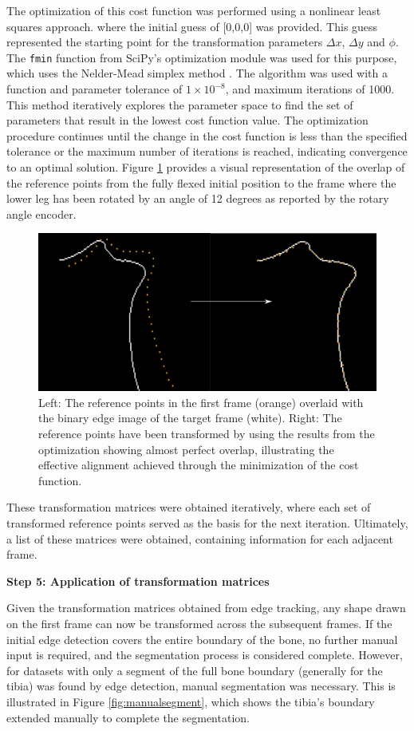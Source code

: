 \documentclass{micro-econ-thesis}
\begin{document}
The optimization of this cost function was performed using a nonlinear least squares approach. where the initial guess of [0,0,0] was provided. This guess represented the starting point for the transformation parameters $\Delta x$, $\Delta y$ and $\phi$. The \texttt{fmin} function from SciPy’s optimization module was used for this purpose, which uses the Nelder-Mead simplex method \parencite{nelder_simplex_1965}. The algorithm was used with a function and parameter tolerance of $1 \times 10^{-8}$, and maximum iterations of 1000. This method iteratively explores the parameter space to find the set of parameters that result in the lowest cost function value. The optimization procedure continues until the change in the cost function is less than the specified tolerance or the maximum number of iterations is reached, indicating convergence to an optimal solution. Figure \ref{fig:edge_tracking} provides a visual representation of the overlap of the reference points from the fully flexed initial position to the frame where the lower leg has been rotated by an angle of 12 degrees as reported by the rotary angle encoder. 
\begin{figure}[H]
	\centering
	\includegraphics[width=0.7\linewidth]{image137}
	\caption{Left: The reference points in the first frame (orange) overlaid with the binary edge image of the target frame (white). Right: The reference points have been transformed by using the results from the optimization showing almost perfect overlap, illustrating the effective alignment achieved through the minimization of the cost function.}
	\label{fig:edge_tracking}
\end{figure}

These transformation matrices were obtained iteratively, where each set of transformed reference points served as the basis for the next iteration. Ultimately, a list of these matrices were obtained, containing information for each adjacent frame. 


\textbf{Step 5: Application of transformation matrices }

Given the transformation matrices obtained from edge tracking, any shape drawn on the first frame can now be transformed across the subsequent frames. If the initial edge detection covers the entire boundary of the bone, no further manual input is required, and the segmentation process is considered complete. However, for datasets with only a segment of the full bone boundary (generally for the tibia) was found by edge detection, manual segmentation was necessary. This is illustrated in Figure \ref{fig:manualsegment}, which shows the tibia's boundary extended manually to complete the segmentation. 
\end{document}
